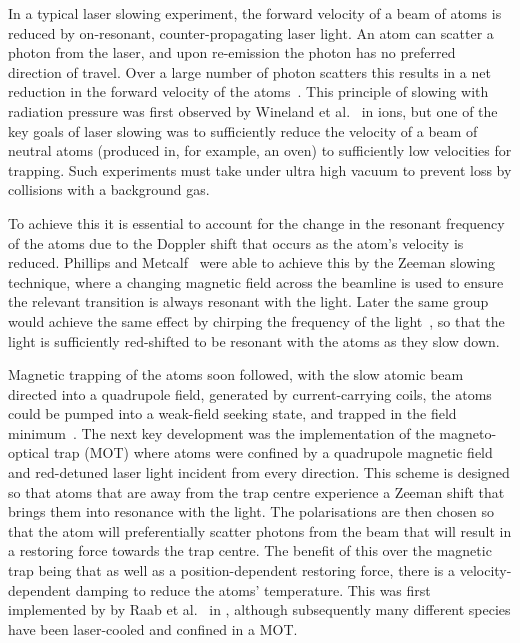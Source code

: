 In a typical laser slowing experiment, the forward velocity of a beam of atoms
is reduced by on-resonant, counter-propagating laser light. An atom can scatter
a photon from the laser, and upon re-emission the photon has no preferred
direction of travel. Over a large number of photon scatters this results in a
net reduction in the forward velocity of the atoms~\cite{PhysRevLett.40.1639}.
This principle of slowing with radiation pressure was first observed by
Wineland et al.~\cite{PhysRevLett.40.1639} in ions, but one of the key goals of
laser slowing was to sufficiently reduce the velocity of a beam of neutral
atoms (produced in, for example, an oven) to sufficiently low velocities for
trapping. Such experiments must take under ultra high vacuum to prevent loss by
collisions with a background gas.

To achieve this it is essential to account for the change in the resonant
frequency of the atoms due to the Doppler shift that occurs as the atom's
velocity is reduced. Phillips and Metcalf~\cite{PhysRevLett.48.596} were able
to achieve this by the Zeeman slowing technique, where a changing magnetic
field across the beamline is used to ensure the relevant transition is always
resonant with the light. Later the same group would achieve the same effect by
chirping the frequency of the light~\cite{Prodan1984}, so that the light is
sufficiently red-shifted to be resonant with the atoms as they slow down.

Magnetic trapping of the atoms soon followed, with the slow atomic beam
directed into a quadrupole field, generated by current-carrying coils, the
atoms could be pumped into a weak-field seeking state, and trapped in the field
minimum~\cite{PhysRevLett.54.2596}. The next key development was the
implementation of the magneto-optical trap (MOT) where atoms were confined by a
quadrupole magnetic field and red-detuned laser light incident from every
direction. This scheme is designed so that atoms that are away from the trap
centre experience a Zeeman shift that brings them into resonance with the
light. The polarisations are then chosen so that the atom will preferentially
scatter photons from the beam that will result in a restoring force towards the
trap centre. The benefit of this over the magnetic trap being that as well as
a position-dependent restoring force, there is a velocity-dependent damping to
reduce the atoms' temperature. This was first implemented by by Raab et
al.~\cite{PhysRevLett.59.2631} in \Na{}, although subsequently many different
species have been laser-cooled and confined in a MOT.

